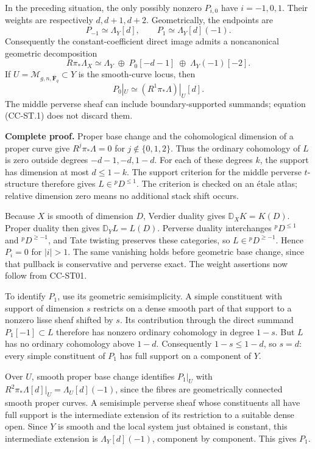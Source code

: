 \documentclass[11pt,a4paper]{article}
\theoremstyle{definition}\newtheorem{definition}[theorem]{Definition}
\theoremstyle{remark}\newtheorem{remark}[theorem]{Remark}
\begin{document}
In the preceding situation, the only possibly nonzero \(P_{i,0}\) have
\(i=-1,0,1\). Their weights are respectively \(d,d+1,d+2\).
Geometrically, the endpoints are \[
P_{-1}\simeq\Lambda_Y[d],\qquad
P_1\simeq\Lambda_Y[d](-1).
\] Consequently the constant-coefficient direct image admits a
noncanonical geometric decomposition \[
R\pi_*\Lambda_X\simeq
\Lambda_Y\;\oplus\;P_0[-d-1]\;\oplus\;\Lambda_Y(-1)[-2].
\tag{CC-ST.1}
\] If \(U=\mathcal M_{g,n,\overline{\mathbf F}_q}\subset Y\) is the
smooth-curve locus, then \[
P_0|_U\simeq (R^1\pi_*\Lambda)|_U[d].
\] The middle perverse sheaf can include boundary-supported summands;
equation (CC-ST.1) does not discard them.

\textbf{Complete proof.} Proper base change and the cohomological
dimension of a proper curve give \(R^j\pi_*\Lambda=0\) for
\(j\notin\{0,1,2\}\). Thus the ordinary cohomology of \(L\) is zero
outside degrees \(-d-1,-d,1-d\). For each of these degrees \(k\), the
support has dimension at most \(d\leq1-k\). The support criterion for
the middle perverse \(t\)-structure therefore gives
\(L\in{}^pD^{\leq1}\). The criterion is checked on an étale atlas;
relative dimension zero means no additional stack shift occurs.

Because \(X\) is smooth of dimension \(D\), Verdier duality gives
\(\mathbb D_XK=K(D)\). Proper duality then gives \(\mathbb D_YL=L(D)\).
Perverse duality interchanges \({}^pD^{\leq1}\) and \({}^pD^{\geq-1}\),
and Tate twisting preserves these categories, so \(L\in{}^pD^{\geq-1}\).
Hence \(P_i=0\) for \(|i|>1\). The same vanishing holds before geometric
base change, since that pullback is conservative and perverse exact. The
weight assertions now follow from CC-ST01.

To identify \(P_1\), use its geometric semisimplicity. A simple
constituent with support of dimension \(s\) restricts on a dense smooth
part of that support to a nonzero lisse sheaf shifted by \(s\). Its
contribution through the direct summand \(P_1[-1]\subset L\) therefore
has nonzero ordinary cohomology in degree \(1-s\). But \(L\) has no
ordinary cohomology above \(1-d\). Consequently \(1-s\leq1-d\), so
\(s=d\): every simple constituent of \(P_1\) has full support on a
component of \(Y\).

Over \(U\), smooth proper base change identifies \(P_1|_U\) with
\(R^2\pi_*\Lambda[d]|_U=\Lambda_U[d](-1)\), since the fibres are
geometrically connected smooth proper curves. A semisimple perverse
sheaf whose constituents all have full support is the intermediate
extension of its restriction to a suitable dense open. Since \(Y\) is
smooth and the local system just obtained is constant, this intermediate
extension is \(\Lambda_Y[d](-1)\), component by component. This gives
\(P_1\).
\end{document}
